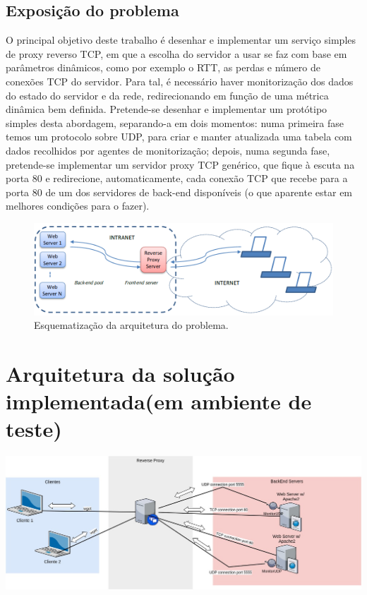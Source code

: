 \documentclass{llncs}
\begin{document}
\subsection{Exposição do problema}

O principal objetivo deste trabalho é desenhar e implementar um serviço simples de proxy reverso TCP, em que a escolha do servidor a usar se
faz com base em parâmetros dinâmicos, como por exemplo o RTT, as perdas e número de conexões TCP do servidor. Para tal, é necessário haver monitorização dos dados do estado do servidor e da rede, redirecionando em função de uma métrica dinâmica bem definida. Pretende-se desenhar e implementar um protótipo simples desta abordagem, separando-a em dois momentos: numa primeira fase temos um protocolo sobre UDP, para criar e manter atualizada uma tabela com dados recolhidos por agentes de monitorização; depois, numa segunda fase, pretende-se implementar um servidor proxy TCP genérico, que fique à escuta na porta 80 e redirecione, automaticamente, cada conexão TCP que recebe para a porta 80 de um dos servidores de back-end disponíveis (o que aparente estar em melhores condições para o fazer).

\begin{figure}[H]
\centering
\includegraphics[width=150mm, scale=0.5]{imagem_enunciado.PNG}
\caption{\label{fig:change}Esquematização da arquitetura do problema.}
\end{figure}

\newpage

\section{Arquitetura da solução implementada(em ambiente de teste)}
\includegraphics[width=160mm, scale=1]{imagemArq.jpg}
\end{document}
